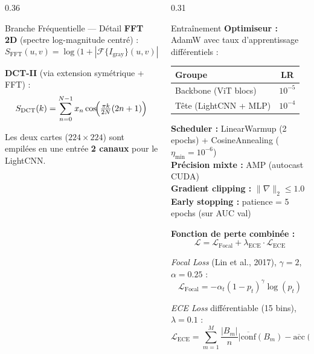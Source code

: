 \documentclass[final]{beamer}
\begin{document}
\begin{frame}[t]
\begin{columns}[t]
\begin{column}{0.36\linewidth}
\begin{alertblock}{Branche Fréquentielle — Détail}
\vspace{6pt}
\textbf{FFT 2D} (spectre log-magnitude centré) :
$$S_{\text{FFT}}(u,v) = \log\!\bigl(1 + |\mathcal{F}\{I_{\text{gray}}\}(u,v)|\bigr)$$

\textbf{DCT-II} (via extension symétrique + FFT) :
$$S_{\text{DCT}}(k) = \sum_{n=0}^{N-1} x_n \cos\!\Bigl(\tfrac{\pi k}{2N}(2n+1)\Bigr)$$

Les deux cartes ($224\!\times\!224$) sont empilées en une entrée \textbf{2 canaux} pour le LightCNN.
\end{alertblock}

\end{column}

\begin{column}{0.31\linewidth}

\begin{block}{Entraînement}
\textbf{Optimiseur :} AdamW avec taux d'apprentissage différentiels :
\vspace{4pt}
\begin{center}
\begin{tabular}{@{}lc@{}}
\toprule
\textbf{Groupe} & \textbf{LR}\\
\midrule
Backbone (ViT blocs) & $10^{-5}$\\
Tête (LightCNN + MLP) & $10^{-4}$\\
\bottomrule
\end{tabular}
\end{center}

\vspace{6pt}
\textbf{Scheduler :} LinearWarmup (2 epochs) + CosineAnnealing ($\eta_{\min}=10^{-6}$)\\[4pt]
\textbf{Précision mixte :} AMP (autocast CUDA)\\[4pt]
\textbf{Gradient clipping :} $\|\nabla\|_2 \leq 1.0$\\[4pt]
\textbf{Early stopping :} patience = 5 epochs (sur AUC val)

\vspace{8pt}
\textbf{Fonction de perte combinée :}
$$\mathcal{L} = \mathcal{L}_{\text{Focal}} + \lambda_{\text{ECE}} \cdot \mathcal{L}_{\text{ECE}}$$

\textit{Focal Loss} (Lin et al., 2017), $\gamma=2$, $\alpha=0.25$ :
$$\mathcal{L}_{\text{Focal}} = -\alpha_t(1-p_t)^\gamma \log(p_t)$$

\textit{ECE Loss} différentiable (15 bins), $\lambda=0.1$ :
$$\mathcal{L}_{\text{ECE}} = \sum_{m=1}^{M} \frac{|B_m|}{n}\bigl|\overline{\text{conf}}(B_m) - \overline{\text{acc}}(B_m)\bigr|$$
\end{block}


\end{column}
\end{columns}
\end{frame}
\end{document}
